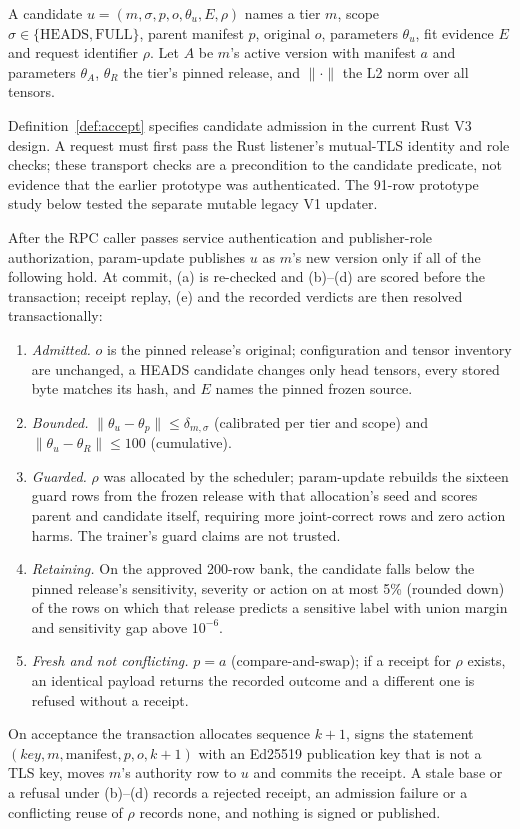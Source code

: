 \documentclass[sigconf]{acmart}
\theoremstyle{acmdefinition}\newtheorem{property}{Property}
\begin{document}
A candidate $u=(m,\sigma,p,o,\theta_u,E,\rho)$ names a tier $m$, scope $\sigma\in\{\text{HEADS},\text{FULL}\}$, parent manifest $p$, original $o$, parameters $\theta_u$, fit evidence $E$ and request identifier $\rho$. Let $A$ be $m$'s active version with manifest $a$ and parameters $\theta_A$, $\theta_R$ the tier's pinned release, and $\lVert\cdot\rVert$ the L2 norm over all tensors.

Definition~\ref{def:accept} specifies candidate admission in the current Rust V3 design. A request must first pass the Rust listener's mutual-TLS identity and role checks; these transport checks are a precondition to the candidate predicate, not evidence that the earlier prototype was authenticated. The 91-row prototype study below tested the separate mutable legacy V1 updater.

\begin{definition}\label{def:accept}
After the RPC caller passes service authentication and publisher-role authorization, param-update publishes $u$ as $m$'s new version only if all of the following hold. At commit, (a) is re-checked and (b)--(d) are scored before the transaction; receipt replay, (e) and the recorded verdicts are then resolved transactionally:
\begin{enumerate}[leftmargin=1.6em,label=(\alph*),itemsep=0pt]
\item \emph{Admitted.} $o$ is the pinned release's original; configuration and tensor inventory are unchanged, a HEADS candidate changes only head tensors, every stored byte matches its hash, and $E$ names the pinned frozen source.
\item \emph{Bounded.} $\lVert\theta_u-\theta_p\rVert\le\delta_{m,\sigma}$ (calibrated per tier and scope) and $\lVert\theta_u-\theta_R\rVert\le100$ (cumulative).
\item \emph{Guarded.} $\rho$ was allocated by the scheduler; param-update rebuilds the sixteen guard rows from the frozen release with that allocation's seed and scores parent and candidate itself, requiring more joint-correct rows and zero action harms. The trainer's guard claims are not trusted.
\item \emph{Retaining.} On the approved 200-row bank, the candidate falls below the pinned release's sensitivity, severity or action on at most 5\% (rounded down) of the rows on which that release predicts a sensitive label with union margin and sensitivity gap above $10^{-6}$.
\item \emph{Fresh and not conflicting.} $p=a$ (compare-and-swap); if a receipt for $\rho$ exists, an identical payload returns the recorded outcome and a different one is refused without a receipt.
\end{enumerate}
On acceptance the transaction allocates sequence $k{+}1$, signs the statement $(\mathit{key},m,\text{manifest},p,o,k{+}1)$ with an Ed25519 publication key that is not a TLS key, moves $m$'s authority row to $u$ and commits the receipt. A stale base or a refusal under (b)--(d) records a rejected receipt, an admission failure or a conflicting reuse of $\rho$ records none, and nothing is signed or published.
\end{definition}
\end{document}
